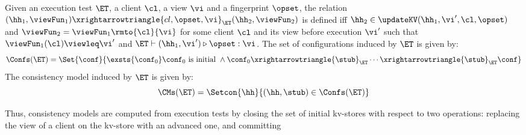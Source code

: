 \begin{definition}
\label{def:cm}
Given an execution test $\ET$, a client $\cl$, a view $\vi$ and a 
fingerprint $\opset$, 
the relation $(\hh_1, \viewFun_1) \xrightarrowtriangle{cl,\opset, \vi}_{\ET} 
(\hh_2, \viewFun_2)$ is defined iff $ \hh_2 \in \updateKV(\hh_1, \vi', \cl, \opset)$ and 
$\viewFun_2 = \viewFun_1\rmto{\cl}{\vi}$ for some client \( \cl \) and its view before execution \( \vi' \) such that
$\viewFun_1(\cl) \viewleq \vi'$ and 
$\ET \vdash (\hh_1, \vi') \triangleright \opset: \vi$.
The set of configurations induced by $\ET$ is given by:
\[
\Confs(\ET) = \Set{ \conf}{ \exsts{\conf_0} \conf_0 \text{ is initial } \wedge \conf_0 \xrightarrowtriangle{\stub}_{\ET} \cdots \xrightarrowtriangle{\stub}_{\ET} \conf }
\]
The consistency model induced by $\ET$ is given by:
\[ 
\CMs(\ET) = \Setcon{ \hh }{ (\hh, \stub) \in \Confs(\ET) }
\]
%
\end{definition}
Thus, consistency models are computed from execution tests by closing the set of initial kv-stores with 
respect to two operations: replacing the view of a client on the kv-store with an advanced one, and committing 
